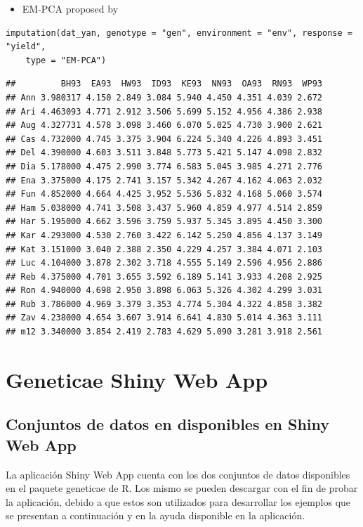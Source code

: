 \begin{itemize}
\item EM-PCA proposed by
\end{itemize}
\begin{lstlisting}
imputation(dat_yan, genotype = "gen", environment = "env", response = "yield", 
    type = "EM-PCA")
\end{lstlisting}

\begin{verbatim}
##         BH93  EA93  HW93  ID93  KE93  NN93  OA93  RN93  WP93
## Ann 3.980317 4.150 2.849 3.084 5.940 4.450 4.351 4.039 2.672
## Ari 4.463093 4.771 2.912 3.506 5.699 5.152 4.956 4.386 2.938
## Aug 4.327731 4.578 3.098 3.460 6.070 5.025 4.730 3.900 2.621
## Cas 4.732000 4.745 3.375 3.904 6.224 5.340 4.226 4.893 3.451
## Del 4.390000 4.603 3.511 3.848 5.773 5.421 5.147 4.098 2.832
## Dia 5.178000 4.475 2.990 3.774 6.583 5.045 3.985 4.271 2.776
## Ena 3.375000 4.175 2.741 3.157 5.342 4.267 4.162 4.063 2.032
## Fun 4.852000 4.664 4.425 3.952 5.536 5.832 4.168 5.060 3.574
## Ham 5.038000 4.741 3.508 3.437 5.960 4.859 4.977 4.514 2.859
## Har 5.195000 4.662 3.596 3.759 5.937 5.345 3.895 4.450 3.300
## Kar 4.293000 4.530 2.760 3.422 6.142 5.250 4.856 4.137 3.149
## Kat 3.151000 3.040 2.388 2.350 4.229 4.257 3.384 4.071 2.103
## Luc 4.104000 3.878 2.302 3.718 4.555 5.149 2.596 4.956 2.886
## Reb 4.375000 4.701 3.655 3.592 6.189 5.141 3.933 4.208 2.925
## Ron 4.940000 4.698 2.950 3.898 6.063 5.326 4.302 4.299 3.031
## Rub 3.786000 4.969 3.379 3.353 4.774 5.304 4.322 4.858 3.382
## Zav 4.238000 4.654 3.607 3.914 6.641 4.830 5.014 4.363 3.111
## m12 3.340000 3.854 2.419 2.783 4.629 5.090 3.281 3.918 2.561
\end{verbatim}


\section{Geneticae Shiny Web App}

\subsection{Conjuntos de datos en disponibles en Shiny Web App}

La aplicación Shiny Web App cuenta con los dos conjuntos de datos disponibles en el paquete geneticae de R. Los mismo se pueden descargar con el fin de probar la aplicación, debido a que estos son utilizados para desarrollar los ejemplos que se presentan a continuación y en la ayuda disponible en la aplicación.

